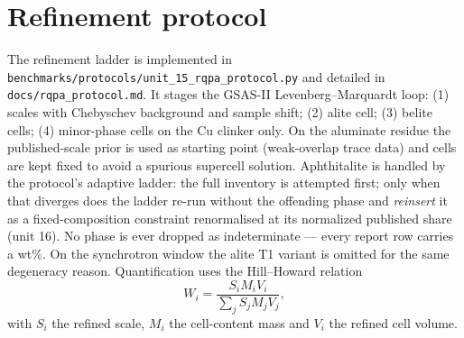 \documentclass[11pt,a4paper]{article}
\begin{document}
\section{Refinement protocol}
The refinement ladder is implemented in
\texttt{benchmarks/protocols/unit\_15\_rqpa\_protocol.py} and detailed in
\texttt{docs/rqpa\_protocol.md}. It stages the GSAS-II
Levenberg--Marquardt loop: (1) scales with Chebyschev background and
sample shift; (2) alite cell; (3) belite cells; (4) minor-phase cells on
the Cu clinker only. On the aluminate residue the published-scale prior
is used as starting point (weak-overlap trace data) and cells are kept
fixed to avoid a spurious supercell solution. Aphthitalite is handled by
the protocol's adaptive ladder: the full inventory is attempted first;
only when that diverges does the ladder re-run without the offending
phase and \emph{reinsert} it as a fixed-composition constraint
renormalised at its normalized published share (unit 16). No phase is
ever dropped as indeterminate --- every report row carries a wt\%. On
the synchrotron window the alite T1 variant is
omitted for the same degeneracy reason. Quantification uses the
Hill--Howard relation
\begin{equation}
W_i = \frac{S_i M_i V_i}{\sum_j S_j M_j V_j},
\label{eq:hh}
\end{equation}
with $S_i$ the refined scale, $M_i$ the cell-content mass and $V_i$ the
refined cell volume.
\end{document}
